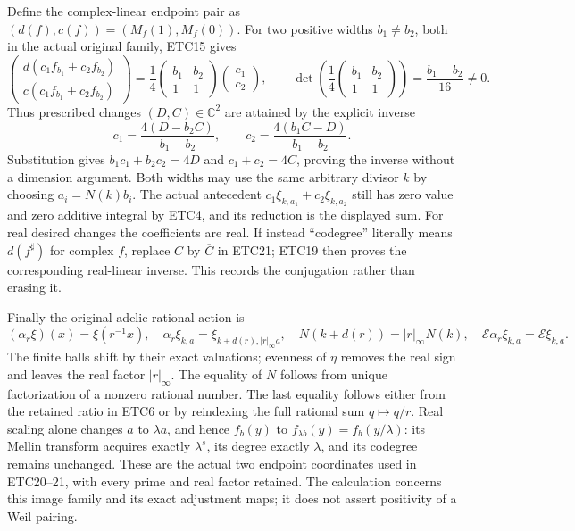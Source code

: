 Define the complex-linear endpoint pair as
$(d(f),c(f))=(M_f(1),M_f(0))$. For two positive widths
$b_1\ne b_2$, both in the actual original family, ETC15 gives
\begin{equation}\tag{ETC20}
 \begin{pmatrix}d(c_1f_{b_1}+c_2f_{b_2})\\
                 c(c_1f_{b_1}+c_2f_{b_2})\end{pmatrix}
 =\frac14\begin{pmatrix}b_1&b_2\\1&1\end{pmatrix}
             \begin{pmatrix}c_1\\c_2\end{pmatrix},\qquad
 \det\left(\frac14\begin{pmatrix}b_1&b_2\\1&1\end{pmatrix}\right)
 =\frac{b_1-b_2}{16}\ne0.
\end{equation}
Thus prescribed changes $(D,C)\in\mathbb C^2$ are attained by
the explicit inverse
\begin{equation}\tag{ETC21}
 c_1=\frac{4(D-b_2C)}{b_1-b_2},\qquad
 c_2=\frac{4(b_1C-D)}{b_1-b_2}.
\end{equation}
Substitution gives $b_1c_1+b_2c_2=4D$ and $c_1+c_2=4C$,
proving the inverse without a dimension argument. Both widths may
use the same arbitrary divisor $k$ by choosing $a_i=N(k)b_i$.
The actual antecedent
$c_1\xi_{k,a_1}+c_2\xi_{k,a_2}$ still has zero value and zero
additive integral by ETC4, and its reduction is the displayed sum.
For real desired changes the coefficients are real. If instead
``codegree'' literally means $d(f^\sharp)$ for complex $f$,
replace $C$ by $\overline C$ in ETC21; ETC19 then proves the
corresponding real-linear inverse. This records the conjugation
rather than erasing it.

Finally the original adelic rational action is
\begin{equation}\tag{ETC22}
 (\alpha_r\xi)(x)=\xi(r^{-1}x),\quad
 \alpha_r\xi_{k,a}=\xi_{k+d(r),|r|_\infty a},\quad
 N(k+d(r))=|r|_\infty N(k),\quad
 \mathcal E\alpha_r\xi_{k,a}=\mathcal E\xi_{k,a}.
\end{equation}
The finite balls shift by their exact valuations; evenness of $\eta$
removes the real sign and leaves the real factor $|r|_\infty$.
The equality of $N$ follows from unique factorization of a nonzero
rational number. The last equality follows either from the retained
ratio in ETC6 or by reindexing the full rational sum $q\mapsto q/r$.
Real scaling alone changes $a$ to $\lambda a$, and hence
$f_b(y)$ to $f_{\lambda b}(y)=f_b(y/\lambda)$: its Mellin transform
acquires exactly $\lambda^s$, its degree exactly $\lambda$, and its
codegree remains unchanged. These are the actual two endpoint
coordinates used in ETC20--21, with every prime and real factor
retained. The calculation concerns this image family and its exact
adjustment maps; it does not assert positivity of a Weil pairing.

